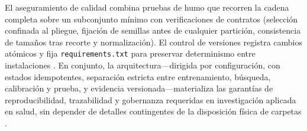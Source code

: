 El aseguramiento de calidad combina pruebas de humo que recorren la cadena completa sobre un subconjunto mínimo con verificaciones de contratos (selección confinada al pliegue, fijación de semillas antes de cualquier partición, consistencia de tamaños tras recorte y normalización). El control de versiones registra cambios atómicos y fija \texttt{requirements.txt} para preservar determinismo entre instalaciones \cite{Pedregosa2011,EAFIT2018}. En conjunto, la arquitectura—dirigida por configuración, con estados idempotentes, separación estricta entre entrenamiento, búsqueda, calibración y prueba, y evidencia versionada—materializa las garantías de reproducibilidad, trazabilidad y gobernanza requeridas en investigación aplicada en salud, sin depender de detalles contingentes de la disposición física de carpetas \cite{Tsamardinos2022,Vabalas2019,EAFIT2018}.
